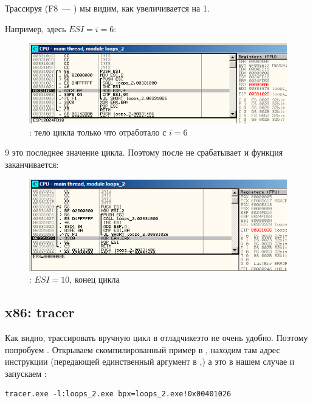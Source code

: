 Трассируя (F8~--- \stepover) мы видим, как \ESI увеличивается на 1.

Например, здесь $ESI=i=6$:

\begin{figure}[H]
\centering
\includegraphics[scale=\FigScale]{patterns/09_loops/simple/olly2.png}
\caption{\olly: тело цикла только что отработало с $i=6$}
\label{fig:loops_olly_2}
\end{figure}

9 это последнее значение цикла.
Поэтому \JL после  не срабатывает и функция заканчивается:

\begin{figure}[H]
\centering
\includegraphics[scale=\FigScale]{patterns/09_loops/simple/olly3.png}
\caption{\olly: $ESI=10$, конец цикла}
\label{fig:loops_olly_3}
\end{figure}

\subsection{x86: tracer}

Как видно, трассировать вручную цикл в отладчике\EMDASH{}это не очень удобно.
Поэтому попробуем \tracer.
Открываем скомпилированный пример в \IDA, находим там адрес инструкции 
(передающей единственный аргумент в \ttf,)
а это  в нашем случае и запускаем \tracer:

\begin{lstlisting}
tracer.exe -l:loops_2.exe bpx=loops_2.exe!0x00401026
\end{lstlisting}

